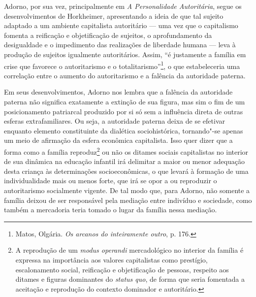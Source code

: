 Adorno, por sua vez, principalmente em \emph{A Personalidade
Autoritária}, segue os desenvolvimentos de Horkheimer, apresentando a
ideia de que tal sujeito adaptado a um ambiente capitalista autoritário
--- uma vez que o capitalismo fomenta a reificação e objetificação de
sujeitos, o aprofundamento da desigualdade e o impedimento das
realizações de liberdade humana --- leva à produção de sujeitos
igualmente autoritários. Assim, ``é justamente a família em crise que
favorece o autoritarismo e o totalitarismo''\footnote{Matos, Olgária.
  \emph{Os arcanos do inteiramente outro}, p. 176.}, o que estabeleceria
uma correlação entre o aumento do autoritarismo e a falência da
autoridade paterna.

Em seus desenvolvimentos, Adorno nos lembra que a falência da autoridade
paterna não significa exatamente a extinção de sua figura, mas sim o fim
de um posicionamento patriarcal produzido por si só sem a influência
direta de outras esferas extrafamiliares. Ou seja, a autoridade paterna
deixa de se efetivar enquanto elemento constituinte da dialética
sociohistórica, tornando"-se apenas um meio de afirmação da esfera
econômica capitalista. Isso quer dizer que a forma como a família
reproduz\footnote{A reprodução de um \emph{modus operandi} mercadológico
  no interior da família é expressa na importância aos valores
  capitalistas como prestígio, escalonamento social, reificação e
  objetificação de pessoas, respeito aos ditames e figuras dominantes do
  \emph{status quo}, de forma que seria fomentada a aceitação e
  reprodução do contexto dominador e autoritário.} ou não os ditames
sociais capitalistas no interior de sua dinâmica na educação infantil
irá delimitar a maior ou menor adequação desta criança às determinações
socioeconômicas, o que levará à formação de uma individualidade mais ou
menos forte, que irá se opor a ou reproduzir o autoritarismo socialmente
vigente. De tal modo que, para Adorno, não somente a família deixou de
ser responsável pela mediação entre indivíduo e sociedade, como também a
mercadoria teria tomado o lugar da família nessa mediação.

